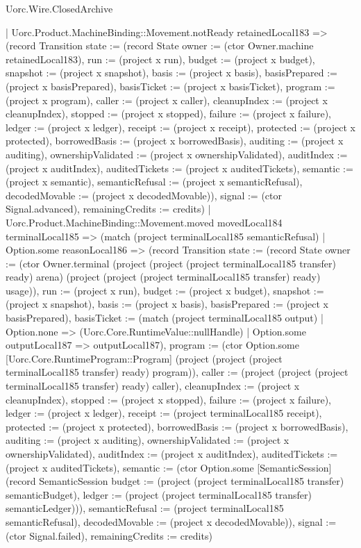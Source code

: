 \begin{lexlean}{Uorc.Wire.ClosedArchive}
\begin{semanticmodule}
{      | Uorc.Product.MachineBinding::Movement.notReady retainedLocal183 => (record Transition {state := (record State {owner := (ctor Owner.machine retainedLocal183), run := (project x run), budget := (project x budget), snapshot := (project x snapshot), basis := (project x basis), basisPrepared := (project x basisPrepared), basisTicket := (project x basisTicket), program := (project x program), caller := (project x caller), cleanupIndex := (project x cleanupIndex), stopped := (project x stopped), failure := (project x failure), ledger := (project x ledger), receipt := (project x receipt), protected := (project x protected), borrowedBasis := (project x borrowedBasis), auditing := (project x auditing), ownershipValidated := (project x ownershipValidated), auditIndex := (project x auditIndex), auditedTickets := (project x auditedTickets), semantic := (project x semantic), semanticRefusal := (project x semanticRefusal), decodedMovable := (project x decodedMovable)}), signal := (ctor Signal.advanced), remainingCredits := credits})
      | Uorc.Product.MachineBinding::Movement.moved movedLocal184 terminalLocal185 => (match (project terminalLocal185 semanticRefusal)
        | Option.some reasonLocal186 => (record Transition {state := (record State {owner := (ctor Owner.terminal (project (project (project terminalLocal185 transfer) ready) arena) (project (project (project terminalLocal185 transfer) ready) usage)), run := (project x run), budget := (project x budget), snapshot := (project x snapshot), basis := (project x basis), basisPrepared := (project x basisPrepared), basisTicket := (match (project terminalLocal185 output)
          | Option.none => (Uorc.Core.RuntimeValue::nullHandle)
          | Option.some outputLocal187 => outputLocal187), program := (ctor Option.some [Uorc.Core.RuntimeProgram::Program] (project (project (project terminalLocal185 transfer) ready) program)), caller := (project (project (project terminalLocal185 transfer) ready) caller), cleanupIndex := (project x cleanupIndex), stopped := (project x stopped), failure := (project x failure), ledger := (project x ledger), receipt := (project terminalLocal185 receipt), protected := (project x protected), borrowedBasis := (project x borrowedBasis), auditing := (project x auditing), ownershipValidated := (project x ownershipValidated), auditIndex := (project x auditIndex), auditedTickets := (project x auditedTickets), semantic := (ctor Option.some [SemanticSession] (record SemanticSession {budget := (project (project terminalLocal185 transfer) semanticBudget), ledger := (project (project terminalLocal185 transfer) semanticLedger)})), semanticRefusal := (project terminalLocal185 semanticRefusal), decodedMovable := (project x decodedMovable)}), signal := (ctor Signal.failed), remainingCredits := credits})
}
\end{semanticmodule}
\end{lexlean}
